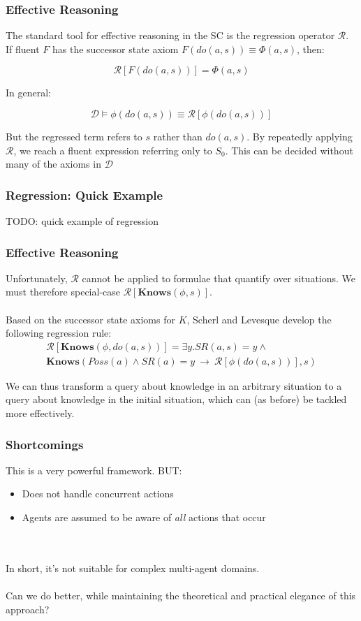 \documentclass{beamer}
\begin{document}
\begin{frame}
\frametitle{Effective Reasoning}
The standard tool for effective reasoning in the SC is the
regression operator $\mathcal{R}$. If fluent $F$ has the successor state axiom
$F(do(a,s)) \equiv \Phi(a,s)$, then:

\[ \mathcal{R}[F(do(a,s))] = \Phi(a,s) \]

\pause
In general:

\[  \mathcal{D} \models \phi(do(a,s)) \equiv \mathcal{R}[\phi(do(a,s))] \]

But the regressed term refers to $s$ rather than $do(a,s)$.
By repeatedly applying $\mathcal{R}$, we reach a fluent expression referring
only to $S_0$.  This can be decided without many of the axioms in $\mathcal{D}$

\end{frame}

\begin{frame}
\frametitle{Regression: Quick Example}

TODO: quick example of regression

\end{frame}

\begin{frame}
\frametitle{Effective Reasoning}
Unfortunately, $\mathcal{R}$ cannot be applied to formulae that quantify
over situations.  We must therefore special-case
$\mathcal{R}[\mathbf{Knows}(\phi,s)]$.
\ \\
\ \\
Based on the successor state axioms for $K$, Scherl and Levesque develop
the following regression rule:
\begin{multline*}
  \mathcal{R}[\mathbf{Knows}(\phi,do(a,s))] =
    \exists y . SR(a,s) = y \wedge \\
    \mathbf{Knows}(Poss(a) \wedge SR(a)=y\ \rightarrow\ \mathcal{R}[\phi(do(a,s))],s)
\end{multline*}

We can thus transform a query about knowledge in an arbitrary situation to
a query about knowledge in the initial situation, which can (as before) be
tackled more effectively.

\end{frame}

\begin{frame}
\frametitle{Shortcomings}
This is a very powerful framework.  BUT:
\begin{itemize}
 \item Does not handle concurrent actions
 \item Agents are assumed to be aware of \emph{all} actions that occur
\end{itemize}
\ \\
\ \\
\pause
In short, it's not suitable for complex multi-agent domains.
\ \\
\ \\
Can we do better, while maintaining the theoretical and practical elegance
of this approach?
\end{frame}
\end{document}
